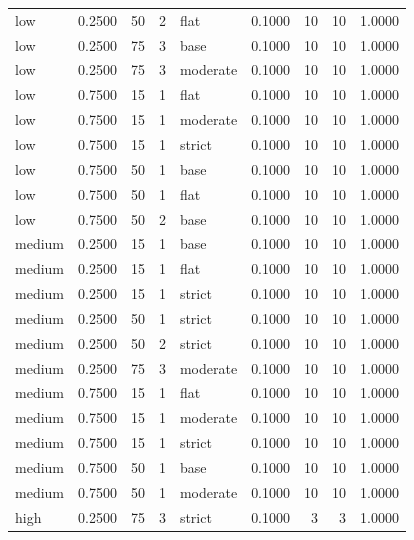 \begin{tabular}{lrrrlrrrr}
low & 0.2500 & 50 & 2 & flat & 0.1000 & 10 & 10 & 1.0000 \\
low & 0.2500 & 75 & 3 & base & 0.1000 & 10 & 10 & 1.0000 \\
low & 0.2500 & 75 & 3 & moderate & 0.1000 & 10 & 10 & 1.0000 \\
low & 0.7500 & 15 & 1 & flat & 0.1000 & 10 & 10 & 1.0000 \\
low & 0.7500 & 15 & 1 & moderate & 0.1000 & 10 & 10 & 1.0000 \\
low & 0.7500 & 15 & 1 & strict & 0.1000 & 10 & 10 & 1.0000 \\
low & 0.7500 & 50 & 1 & base & 0.1000 & 10 & 10 & 1.0000 \\
low & 0.7500 & 50 & 1 & flat & 0.1000 & 10 & 10 & 1.0000 \\
low & 0.7500 & 50 & 2 & base & 0.1000 & 10 & 10 & 1.0000 \\
medium & 0.2500 & 15 & 1 & base & 0.1000 & 10 & 10 & 1.0000 \\
medium & 0.2500 & 15 & 1 & flat & 0.1000 & 10 & 10 & 1.0000 \\
medium & 0.2500 & 15 & 1 & strict & 0.1000 & 10 & 10 & 1.0000 \\
medium & 0.2500 & 50 & 1 & strict & 0.1000 & 10 & 10 & 1.0000 \\
medium & 0.2500 & 50 & 2 & strict & 0.1000 & 10 & 10 & 1.0000 \\
medium & 0.2500 & 75 & 3 & moderate & 0.1000 & 10 & 10 & 1.0000 \\
medium & 0.7500 & 15 & 1 & flat & 0.1000 & 10 & 10 & 1.0000 \\
medium & 0.7500 & 15 & 1 & moderate & 0.1000 & 10 & 10 & 1.0000 \\
medium & 0.7500 & 15 & 1 & strict & 0.1000 & 10 & 10 & 1.0000 \\
medium & 0.7500 & 50 & 1 & base & 0.1000 & 10 & 10 & 1.0000 \\
medium & 0.7500 & 50 & 1 & moderate & 0.1000 & 10 & 10 & 1.0000 \\
high & 0.2500 & 75 & 3 & strict & 0.1000 & 3 & 3 & 1.0000 \\
\bottomrule
\end{tabular}

